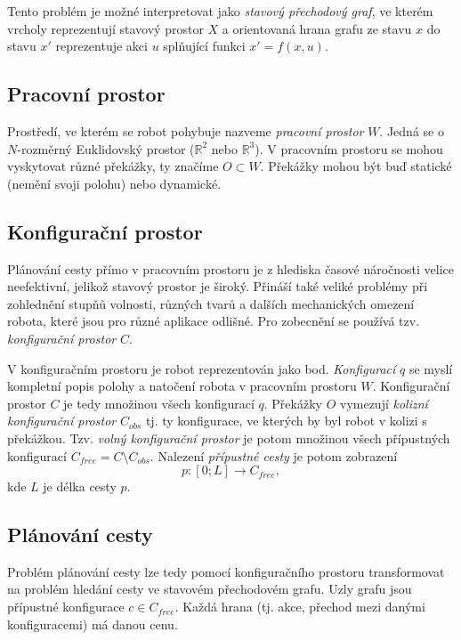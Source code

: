 Tento problém je možné interpretovat jako \emph{stavový přechodový graf}, ve kterém vrcholy reprezentují stavový prostor $X$ a orientovaná hrana grafu ze stavu $x$ do stavu $x'$ reprezentuje akci $u$ splňující funkci $x'=f(x,u)$. \cite{LaValle2006}

\subsection{Pracovní prostor}
Prostředí, ve kterém se robot pohybuje nazveme \emph{pracovní prostor} $W$. Jedná se o $N$-rozměrný Euklidovský prostor ($\mathbb{R}^2$ nebo $\mathbb{R}^3$). V pracovním prostoru se mohou vyskytovat různé překážky, ty značíme $O\subset W$. Překážky mohou být buď statické (nemění svoji polohu) nebo dynamické. \cite{Koubaa20180406}


\subsection{Konfigurační prostor}
Plánování cesty přímo v pracovním prostoru je z hlediska časové náročnosti velice neefektivní, jelikož stavový prostor je široký. Přináší také veliké problémy při zohlednění stupňů volnosti, různých tvarů a dalších mechanických omezení robota, které jsou pro různé aplikace odlišné. Pro zobecnění se používá tzv. \emph{konfigurační prostor} $C$.

V konfiguračním prostoru je robot reprezentován jako bod. \emph{Konfigurací} $q$ se myslí kompletní popis polohy a natočení robota v pracovním prostoru $W$. Konfigurační prostor $C$ je tedy množinou všech konfigurací $q$. Překážky $O$ vymezují \emph{kolizní konfigurační prostor} $C_{obs}$ tj. ty konfigurace, ve kterých by byl robot v kolizi s překážkou. Tzv. \emph{volný konfigurační prostor} je potom množinou všech přípustných konfigurací $C_{free}=C \setminus C_{obs}$. Nalezení \emph{přípustné cesty} je potom zobrazení
\begin{equation}
p: \left[0;L\right]\to C_{free},
\end{equation}
kde $L$ je délka cesty $p$. \cite{Koubaa20180406,Parker2009}

\subsection{Plánování cesty}

Problém plánování cesty lze tedy pomocí konfiguračního prostoru transformovat na problém hledání cesty ve stavovém přechodovém grafu. Uzly grafu jsou přípustné konfigurace $c\in C_{free}$. Každá hrana (tj. akce, přechod mezi danými konfiguracemi) má danou cenu. \cite{Ferguson2005}

